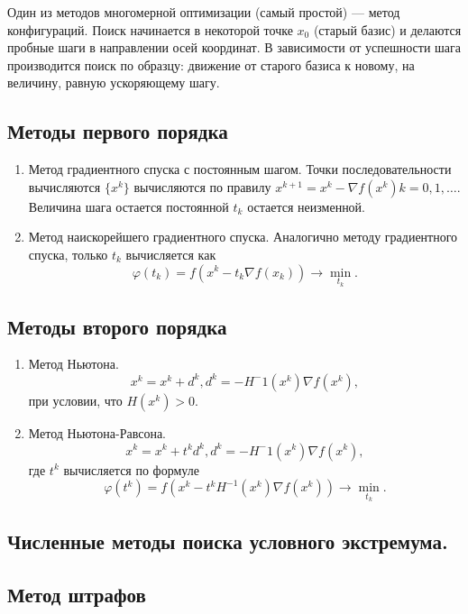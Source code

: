 \documentclass[12pt]{report}
\theoremstyle{definition}
\begin{document}
Один из методов многомерной оптимизации (самый простой) --- метод конфигураций.
Поиск начинается в некоторой точке $x_0$ (старый базис) и делаются пробные шаги в направлении
осей координат. В зависимости от успешности шага производится поиск по образцу: движение от
старого базиса к новому, на величину, равную ускоряющему шагу.

\subsection{Методы первого порядка}
\begin{enumerate}
\item Метод градиентного спуска с постоянным шагом.
  Точки последовательности вычисляются $\{x^k\}$ вычисляются
  по правилу $x^{k+1} = x^k - \nabla f (x^k) k = 0, 1, \dots$.
  Величина шага остается постоянной $t_k$ остается неизменной.
\item Метод наискорейшего градиентного спуска. Аналогично методу
  градиентного спуска, только $t_k$ вычисляется как
  $$
  \varphi(t_k) = f(x^k - t_k \nabla f(x_k)) \rightarrow \min\limits_{t_k}.
  $$
\end{enumerate}


\subsection{Методы второго порядка}
\begin{enumerate}
\item Метод Ньютона.
  $$
    x^k = x^k + d^k,
    d^k = -H^-{1}(x^k) \nabla f(x^k),
  $$
  при условии, что $H(x^k) > 0$.
\item Метод Ньютона-Равсона.
    $$
    x^k = x^k + t^k d^k,
    d^k = -H^-{1}(x^k) \nabla f(x^k),
  $$
  где $t^k$ вычисляется по формуле
  $$
    \varphi(t^k) = f(x^k - t^k H^{-1}(x^k) \nabla f(x^k)) \rightarrow \min\limits_{t_k}.
  $$
\end{enumerate}


\subsection
{
  Численные методы поиска условного экстремума.
}

\subsection
{
  Метод штрафов
}
\end{document}
